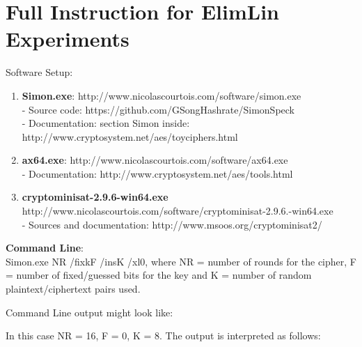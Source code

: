 
\appendix
\chapter{Full Instruction for ElimLin Experiments}
\label{appendixlabel1}

Software Setup:
\begin{enumerate}
	\item \textbf{Simon.exe}: http://www.nicolascourtois.com/software/simon.exe \\ 
	- Source code: https://github.com/GSongHashrate/SimonSpeck \\
	- Documentation: section Simon inside: http://www.cryptosystem.net/aes/toyciphers.html
	\item \textbf{ax64.exe}:  http://www.nicolascourtois.com/software/ax64.exe \\
	- Documentation: http://www.cryptosystem.net/aes/tools.html
	\item \textbf{cryptominisat-2.9.6-win64.exe} http://www.nicolascourtois.com/software/cryptominisat-2.9.6.-win64.exe \\
	-  Sources and documentation: http://www.msoos.org/cryptominisat2/
\end{enumerate}

\textbf{Command Line}:\\
Simon.exe NR /fixkF /insK /xl0, where NR = number of rounds for the cipher, F = number of fixed/guessed bits for the key and K = number of random plaintext/ciphertext pairs used.

Command Line output might look like: \\
\noindent{}

In this case NR = 16, F = 0, K = 8. The output is interpreted as follows:\\
\noindent{}

